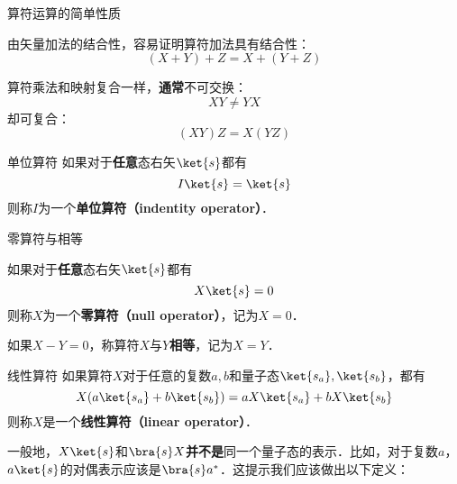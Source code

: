 \begin{theorem}{算符运算的简单性质}\label{QMPrcp_the4}

由矢量加法的结合性，容易证明算符加法具有结合性：
\begin{equation}
(X+Y)+Z=X+(Y+Z)
\end{equation}

算符乘法和映射复合一样，\textbf{通常}不可交换：
\begin{equation}
XY\neq YX
\end{equation}
却可复合：
\begin{equation}
(XY)Z=X(YZ)
\end{equation}


\end{theorem}

\begin{definition}{单位算符}\label{QMPrcp_def9}
如果对于\textbf{任意}态右矢$\ket{s}$都有
\begin{equation}
I\ket{s} = \ket{s}
\end{equation}
则称$I$为一个\textbf{单位算符（indentity operator）}．
\end{definition}



\begin{definition}{零算符与相等}\label{QMPrcp_def10}

如果对于\textbf{任意}态右矢$\ket{s}$都有
\begin{equation}
X\ket{s} = 0
\end{equation}
则称$X$为一个\textbf{零算符（null operator）}，记为$X=0$．

如果$X-Y=0$，称算符$X$与$Y$\textbf{相等}，记为$X=Y$．

\end{definition}







\begin{definition}{线性算符}\label{QMPrcp_def11}
如果算符$X$对于任意的复数$a, b$和量子态$\ket{s_a}, \ket{s_b}$，都有
\begin{equation}
X(a\ket{s_a}+b\ket{s_b}) = aX\ket{s_a}+bX\ket{s_b}
\end{equation}
则称$X$是一个\textbf{线性算符（linear operator）}．
\end{definition}


一般地，$X\ket{s}$和$\bra{s}X$\textbf{并不是}同一个量子态的表示．比如，对于复数$a$，$a\ket{s}$的对偶表示应该是$\bra{s}a^*$．这提示我们应该做出以下定义：

